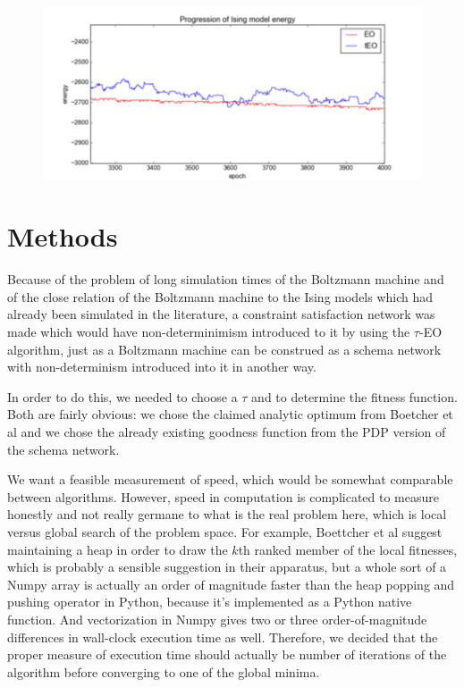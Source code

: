 \documentclass[12pt]{article}
\begin{document}
\begin{figure}
  \includegraphics{ising_energy_zoomed}
\end{figure}

\section{Methods}


Because of the problem of long simulation times of the Boltzmann machine and of the close relation of the Boltzmann machine to the Ising models which had already been simulated in the literature, a constraint satisfaction network was made which would have non-determinimism introduced to it by using the $\tau$-EO algorithm, just as a Boltzmann machine can be construed as a schema network with non-determinism introduced into it in another way.

In order to do this, we needed to choose a $\tau$ and to determine the fitness function. Both are fairly obvious: we chose the claimed analytic optimum from Boetcher et al and we chose the already existing goodness function from the PDP version of the schema network.

We want a feasible measurement of speed, which would be somewhat comparable between algorithms. However, speed in computation is complicated to measure honestly and not really germane to what is the real problem here, which is local versus global search of the problem space. For example, Boettcher et al suggest maintaining a heap in order to draw the $k$th ranked member of the local fitnesses, which is probably a sensible suggestion in their apparatus, but a whole sort of a Numpy array is actually an order of magnitude faster than the heap popping and pushing operator in Python, because it's implemented as a Python native function. And vectorization in Numpy gives two or three order-of-magnitude differences in wall-clock execution time as well. Therefore, we decided that the proper measure of execution time should actually be number of iterations of the algorithm before converging to one of the global minima. %
\end{document}
